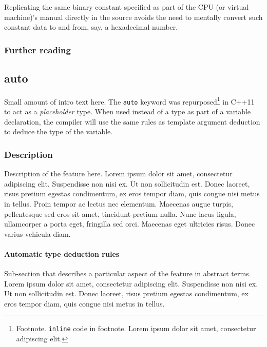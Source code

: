 \documentclass[twoside,10pt,letterpaper,usenames]{newstyle-PearsonGeneric-7-38}
\begin{document}
Replicating the same binary constant specified as part of the CPU (or
virtual machine)'s manual directly in the source avoids the need to
mentally convert such constant data to and from, say, a hexadecimal
number.

\subsubsection[Further reading]{Further reading}\label{further-reading}

\subsection[\tt{auto}]{{\SubsecCode auto}}\label{auto}

Small amount of intro text here. The \texttt{auto} keyword was
repurposed{\cprotect\footnote{Footnote. \texttt{inline} code in
  footnote. Lorem ipsum dolor sit amet, consectetur adipiscing elit.}}
in C++11 to act as a \emph{placeholder} type. When used instead of a
type as part of a variable declaration, the {compiler} will use the same
rules as {template argument deduction} to deduce the type of the
variable.

\subsubsection[Description]{Description}\label{description}

Description of the feature here. Lorem ipsum dolor sit amet, consectetur
adipiscing elit. Suspendisse non nisi ex. Ut non sollicitudin est. Donec
laoreet, risus pretium egestas condimentum, ex eros tempor diam, quis
congue nisi metus in tellus. Proin tempor ac lectus nec elementum.
Maecenas augue turpis, pellentesque sed eros sit amet, tincidunt pretium
nulla. Nunc lacus ligula, ullamcorper a porta eget, fringilla sed orci.
Maecenas eget ultricies risus. Donec varius vehicula diam.

\paragraph[Automatic type deduction rules]{Automatic type deduction rules}\label{automatic-type-deduction-rules}

Sub-section that describes a particular aspect of the feature in
abstract terms. Lorem ipsum dolor sit amet, consectetur adipiscing elit.
Suspendisse non nisi ex. Ut non sollicitudin est. Donec laoreet, risus
pretium egestas condimentum, ex eros tempor diam, quis congue nisi metus
in tellus.
\end{document}
